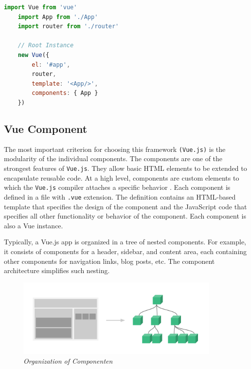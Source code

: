 \begin{lstlisting}[language=JavaScript, caption=main.js]
    import Vue from 'vue'
    import App from './App'
    import router from './router'

    // Root Instance
    new Vue({
        el: '#app',
        router,
        template: '<App/>',
        components: { App }
    })

\end{lstlisting}

\subsection{Vue Component}The most important criterion for choosing this framework \texttt{(Vue.js)} is the modularity of the individual components. The components are one of the strongest features of \texttt{Vue.js}. They allow basic HTML elements to be extended to encapsulate reusable code. At a high level, components are custom elements to which the \texttt{Vue.js} compiler attaches a specific behavior \cite{Vue019:Intro:Online}. Each component is defined in a file with \texttt{.vue} extension. The definition contains an HTML-based template that specifies the design of the component and the JavaScript code that specifies all other functionality or behavior of the component. Each component is also a Vue instance.

Typically, a Vue.js app is organized in a tree of nested components. For example, it consists of components for a header, sidebar, and content area, each containing other components for navigation links, blog posts, etc. The component architecture simplifies such nesting.

\begin{figure}[H]
  \centering
  \includegraphics[width=0.9\textwidth]{Bilder/img/components.png}  
  \caption{ \textit{Organization of Componenten} \cite{VueComponents:Online}}%
\label{fig:OrganisationvonKomponenten}
\end{figure}


